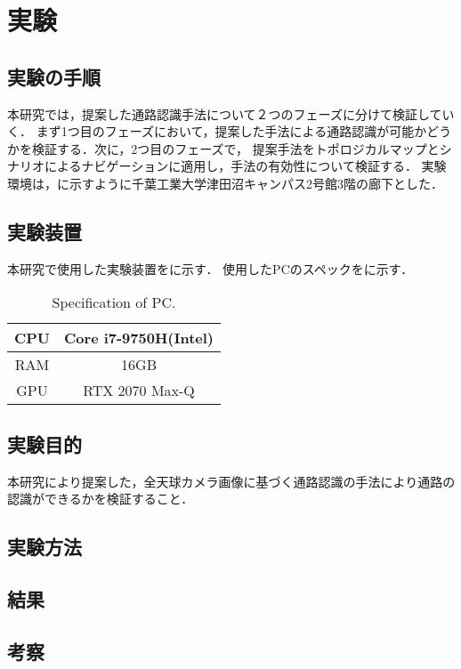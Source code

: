 \documentclass[../main]{subfiles}
\begin{document}
\setcounter{secnumdepth}{2}
    \chapter{実験}
    \section{実験の手順}
    本研究では，提案した通路認識手法について２つのフェーズに分けて検証していく．
    まず1つ目のフェーズにおいて，提案した手法による通路認識が可能かどうかを検証する．次に，2つ目のフェーズで，
    提案手法をトポロジカルマップとシナリオによるナビゲーションに適用し，手法の有効性について検証する．
    実験環境は，に示すように千葉工業大学津田沼キャンパス2号館3階の廊下とした．
    \section{実験装置}
    本研究で使用した実験装置をに示す．
    使用したPCのスペックをに示す．
    \begin{table}[H]
        \centering
        \begin{tabular}{l|l} \hline
        \multicolumn{1}{c|}{CPU} & \multicolumn{1}{c}{Core i7-9750H(Intel)} \\ \hline
        \multicolumn{1}{c|}{RAM} & \multicolumn{1}{c}{16GB} \\ \hline
        \multicolumn{1}{c|}{GPU} & \multicolumn{1}{c}{RTX 2070 Max-Q} \\ \hline
        \end{tabular}
        \caption{Specification of PC.}
        \label{table::pc_spec}
    \end{table}

    \section{実験目的}
    本研究により提案した，全天球カメラ画像に基づく通路認識の手法により通路の認識ができるかを検証すること．
    \section{実験方法}

    \section{結果}
    \section{考察}
\end{document}
